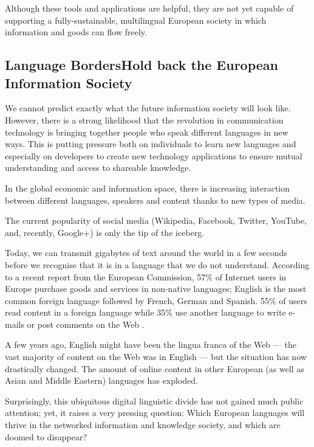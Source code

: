 \begin{multicols}{2}
Although these tools and applications are helpful, they are not yet capable of supporting a fully-sustainable, multilingual European society in which information and goods can flow freely.

\subsection[Language Borders Hold back the European Information Society]{Language Borders\newline Hold back the European Information Society}

We cannot predict exactly what the future information society will look like. However, there is a strong likelihood that the revolution in communication technology is bringing together people who speak different languages in new ways. This is putting pressure both on individuals to learn new languages and especially on developers to create new technology applications to ensure mutual understanding and access to shareable knowledge. 

In the global economic and information space, there is increasing interaction between different languages, speakers and content thanks to new types of media. 

The current popularity of social media (Wikipedia, Facebook, Twitter, YouTube, and, recently, Google+) is only the tip of the iceberg.


Today, we can transmit gigabytes of text around the world in a few seconds before we recognise that it is in a language that we do not understand. According to a recent report from the European Commission, 57\% of Internet users in Europe purchase goods and services in non-native languages; English is the most common foreign language followed by French, German and Spanish. 55\% of users read content in a foreign language while 35\% use another language to write e-mails or post comments on the Web \cite{EC1}. 

A few years ago, English might have been the lingua franca of the Web — the vast majority of content on the Web was in English — but the situation has now drastically changed. The amount of online content in other European (as well as Asian and Middle Eastern) languages has exploded.

Surprisingly, this ubiquitous digital linguistic divide has not gained much public attention; yet, it raises a very pressing question: Which European languages will thrive in the networked information and knowledge society, and which are doomed to disappear?


\end{multicols}
